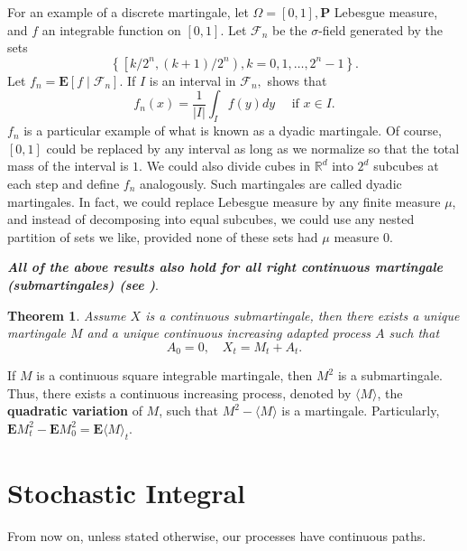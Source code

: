 \documentclass[twoside, 12pt]{book}
\numberwithin{equation}{chapter}
\newtheorem{theorem}{Theorem}[section]
\def\bE{{\mathbf E}}
\begin{document}
    For an example of a discrete martingale, let $\Omega=[0,1], \mathbf{P}$ Lebesgue measure, and $f$ an integrable function on $[0,1]$. Let $\mathcal{F}_n$ be the $\sigma$-field generated by the sets 
    \[
        \left\{\left[k / 2^n,(k+1) / 2^n\right), k=0,1, \ldots, 2^n-1\right\}. 
    \]
    Let $f_n=\mathbf{E}\left[f \mid \mathcal{F}_n\right]$. If $I$ is an interval in $\mathcal{F}_n,$ shows that
    $$
      f_n(x)=\frac{1}{|I|} \int_I f(y) d y \quad \text { if } x \in I.
    $$
    $f_n$ is a particular example of what is known as a dyadic martingale. Of course, $[0,1]$ could be replaced by any interval as long as we normalize so that the total mass of the interval is $1$. We could also divide cubes in $\mathbb{R}^d$ into $2^d$ subcubes at each step and define $f_n$ analogously. Such martingales are called dyadic martingales. In fact, we could replace Lebesgue measure by any finite measure $\mu$, and instead of decomposing into equal subcubes, we could use any nested partition of sets we like, provided none of these sets had $\mu$ measure $0$.
	
	\medspace
	
	{\bf {\em All of the above results also hold for all right continuous martingale (submartingales) (see \cite{Huang})}}. 
	
	\begin{theorem}
	Assume $X$ is a continuous submartingale, then there exists a unique martingale $M$ and a unique continuous increasing adapted process $A$ such that 
	\[
	A_0=0, \quad X_t= M_t+A_t. 
	\]
	\end{theorem}
	If $M$ is a continuous square integrable martingale, then $M^2$ is a submartingale. Thus, there exists a continuous increasing process, denoted by $\langle M\rangle$, the {\bf quadratic variation} of $M$, such that $M^2-\langle M\rangle$ is a martingale. Particularly, $\bE M_t^2 - \bE M_0^2 = \bE \langle M \rangle_t$. 
	 
	
	\section{Stochastic Integral}
	
	From now on, unless stated otherwise, our processes have continuous paths. 
	
\end{document}

